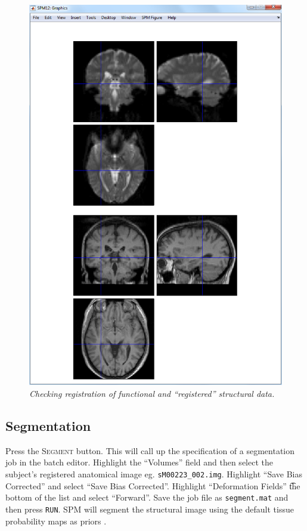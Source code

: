 \begin{figure}
\begin{center}
\includegraphics[width=125mm]{auditory/checkreg}
\caption{\em Checking registration of functional and ``registered'' structural data. \label{aud_checkreg}}
\end{center}
\end{figure}

\subsection{Segmentation}

Press the \textsc{Segment} button. This will call up the specification of a segmentation job in the batch editor. Highlight the ``Volumes'' field and then select the subject's registered anatomical image eg. \texttt{sM00223\_002.img}. Highlight ``Save Bias Corrected'' and select ``Save Bias Corrected''. Highlight ``Deformation Fields'' \t the bottom of the list and select ``Forward''. Save the job file as \texttt{segment.mat} and then press \texttt{RUN}. SPM will segment the structural image using the default tissue probability maps as priors \cite{ashburner05}. 

